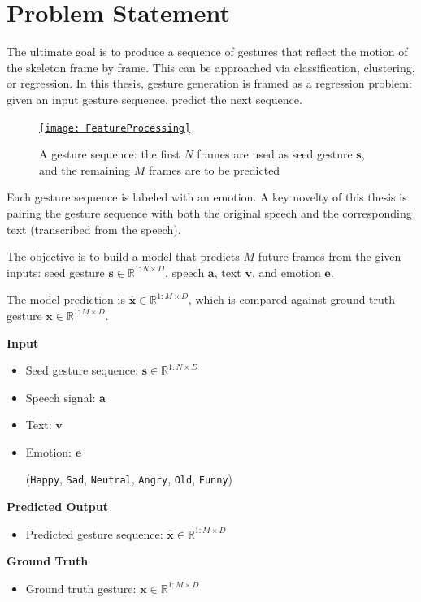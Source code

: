 \section{Problem Statement}
\label{sec:ProblemStatement}

The ultimate goal is to produce a sequence of gestures that reflect the motion of the skeleton frame by frame. This can be approached via classification, clustering, or regression. In this thesis, gesture generation is framed as a regression problem: given an input gesture sequence, predict the next sequence.

\begin{figure}[h]
	\centering
	\href{https://www.youtube.com/watch?v=B6nv1kQmi-Q}{\texttt{[image: FeatureProcessing]}}
	\caption{A gesture sequence: the first $N$ frames are used as seed gesture $\mathbf{s}$, and the remaining $M$ frames are to be predicted}
	\label{fig:GestureSeries}
\end{figure}

Each gesture sequence is labeled with an emotion. A key novelty of this thesis is pairing the gesture sequence with both the original speech and the corresponding text (transcribed from the speech).

The objective is to build a model that predicts $M$ future frames from the given inputs: seed gesture $\mathbf{s} \in \mathbb{R}^{1:N \times D}$, speech $\mathbf{a}$, text $\mathbf{v}$, and emotion $\mathbf{e}$.

The model prediction is $\hat{\mathbf{x}} \in \mathbb{R}^{1:M \times D}$, which is compared against ground-truth gesture $\mathbf{x} \in \mathbb{R}^{1:M \times D}$.

\begin{multicols}{2}
	
\textbf{Input}

\begin{itemize}
	\item Seed gesture sequence: $\mathbf{s} \in \mathbb{R}^{1:N \times D}$
	\item Speech signal: $\mathbf{a}$
	\item Text: $\mathbf{v}$
	\item Emotion: $\mathbf{e}$ 
	
	{\small
		(\texttt{Happy},  \texttt{Sad},  \texttt{Neutral}, \texttt{Angry}, \texttt{Old}, \texttt{Funny})
	}
\end{itemize}

\columnbreak

\textbf{Predicted Output}
\vspace{-10pt}
\begin{itemize}
	\item Predicted gesture sequence:
	$\hat{\mathbf{x}} \in \mathbb{R}^{1:M \times D}$
\end{itemize}

\textbf{Ground Truth}
\vspace{-10pt}
\begin{itemize}
	\item Ground truth gesture: $ \mathbf{x}  \in \mathbb{R}^{1:M \times D}$
\end{itemize}

\end{multicols}

